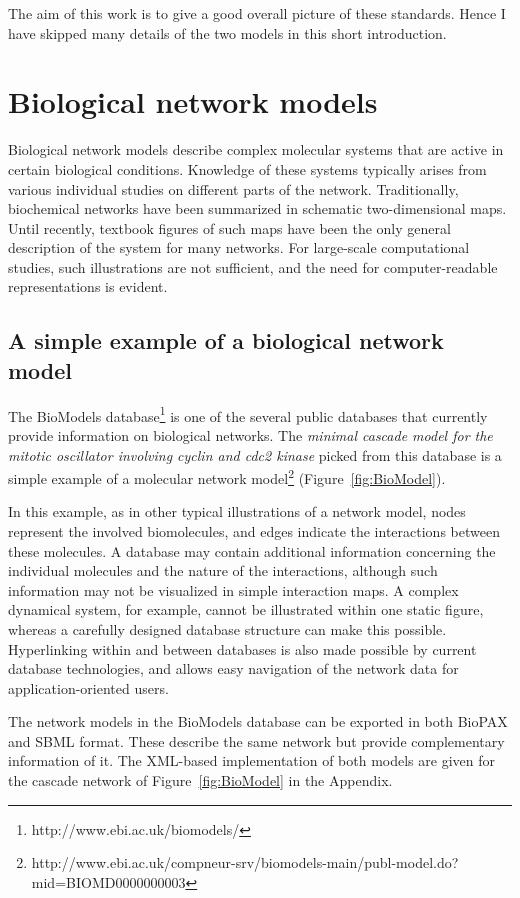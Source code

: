 \documentclass[a4paper,10pt,titlepage]{article}
\begin{document}
The aim of this work is to give a good overall picture of these standards. Hence I have skipped many details of the two models in this short introduction.

\section{Biological network models}

Biological network models describe complex molecular systems that are active in certain biological conditions. Knowledge of these systems typically arises from various individual studies on different parts of the network. Traditionally, biochemical networks have been summarized in schematic two-dimensional maps. Until recently, textbook figures of such maps have been the only general description of the system for many networks. For large-scale computational studies, such illustrations are not sufficient, and the need for computer-readable representations is evident.

\subsection{A simple example of a biological network model}

The BioModels database\footnote{http://www.ebi.ac.uk/biomodels/} is one of the several public databases that currently provide information on biological networks. The {\it minimal cascade model for the mitotic oscillator involving cyclin and cdc2 kinase} \cite{Goldbeter91} picked from this database is a simple example of a molecular network model\footnote{http://www.ebi.ac.uk/compneur-srv/biomodels-main/publ-model.do?mid=BIOMD0000000003} (Figure~\ref{fig:BioModel}).

In this example, as in other typical illustrations of a network model, nodes represent the involved biomolecules, and edges indicate the interactions between these molecules. A database may contain additional information concerning the individual molecules and the nature of the interactions, although such information may not be visualized in simple interaction maps. A complex dynamical system, for example, cannot be illustrated within one static figure, whereas a carefully designed database structure can make this possible. Hyperlinking within and between databases is also made possible by current database technologies, and allows easy navigation of the network data for application-oriented users.

The network models in the BioModels database can be exported in both BioPAX and SBML format. These describe the same network but provide complementary information of it. The XML-based implementation of both models are given for the cascade network of Figure~\ref{fig:BioModel} in the Appendix. 
\end{document}
